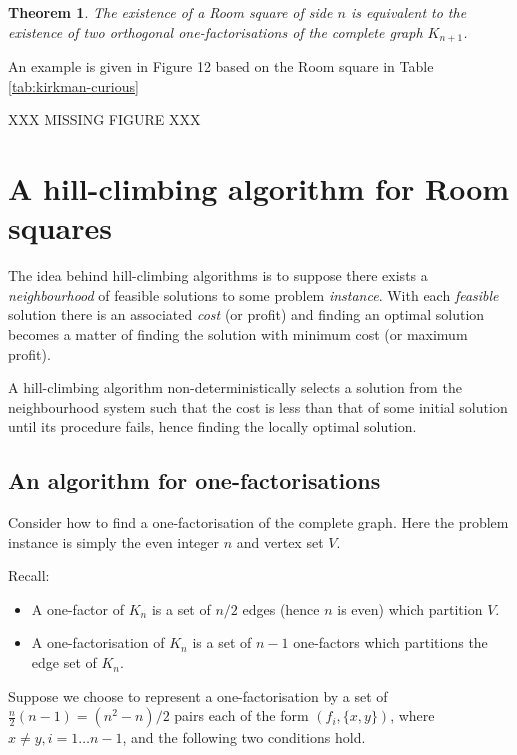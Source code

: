 \documentclass[
  11pt,
  a4paper]{book}
\newtheorem{theorem}{Theorem}
\newcounter{example}
\begin{document}
\begin{theorem}
The existence of a Room square of side $n$
is equivalent to the existence of two orthogonal
one-factorisations of the complete graph $K_{n+1}$.
\end{theorem}

An example is given in Figure 12 based on the Room square in Table
\ref{tab:kirkman-curious}

XXX MISSING FIGURE XXX

\hypertarget{a-hill-climbing-algorithm-for-room-squares}{%
\section{A hill-climbing algorithm for Room
squares}\label{a-hill-climbing-algorithm-for-room-squares}}

The idea behind hill-climbing algorithms is to suppose there exists a
\emph{neighbourhood} of feasible solutions to some problem
\emph{instance}. With each \emph{feasible} solution there is an
associated \emph{cost} (or profit) and finding an optimal solution
becomes a matter of finding the solution with minimum cost (or maximum
profit).

A hill-climbing algorithm non-deterministically selects a solution from
the neighbourhood system such that the cost is less than that of some
initial solution until its procedure fails, hence finding the locally
optimal solution.

\hypertarget{an-algorithm-for-one-factorisations}{%
\subsection{An algorithm for
one-factorisations}\label{an-algorithm-for-one-factorisations}}

Consider how to find a one-factorisation of the complete graph. Here the
problem instance is simply the even integer \(n\) and vertex set \(V\).

Recall:

\begin{itemize}
\item
  A one-factor of \(K_n\) is a set of \(n/2\) edges (hence \(n\) is
  even) which partition \(V\).
\item
  A one-factorisation of \(K_n\) is a set of \(n - 1\) one-factors which
  partitions the edge set of \(K_n\).
\end{itemize}

Suppose we choose to represent a one-factorisation by a set of
\(\frac{n}{2}(n - 1) = (n^2 - n)/2\) pairs each of the form
\((f_i, \{x, y\})\), where \(x \neq y, i = 1 \ldots n - 1\), and the
following two conditions hold.
\end{document}
